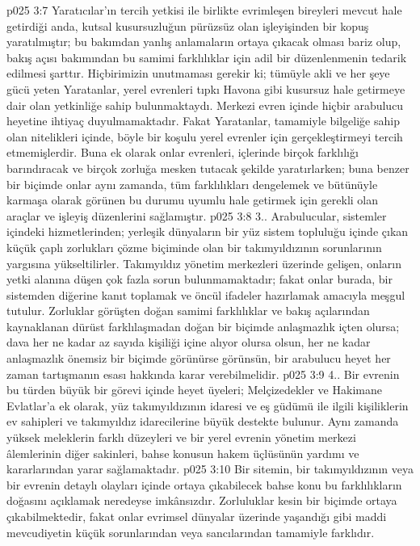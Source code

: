 \vs p025 3:7 Yaratıcılar’ın tercih yetkisi ile birlikte evrimleşen bireyleri mevcut hale getirdiği anda, kutsal kusursuzluğun pürüzsüz olan işleyişinden bir kopuş yaratılmıştır; bu bakımdan yanlış anlamaların ortaya çıkacak olması bariz olup, bakış açısı bakımından bu samimi farklılıklar için adil bir düzenlenmenin tedarik edilmesi şarttır. Hiçbirimizin unutmaması gerekir ki; tümüyle akli ve her şeye gücü yeten Yaratanlar, yerel evrenleri tıpkı Havona gibi kusursuz hale getirmeye dair olan yetkinliğe sahip bulunmaktaydı. Merkezi evren içinde hiçbir arabulucu heyetine ihtiyaç duyulmamaktadır. Fakat Yaratanlar, tamamiyle bilgeliğe sahip olan nitelikleri içinde, böyle bir koşulu yerel evrenler için gerçekleştirmeyi tercih etmemişlerdir. Buna ek olarak onlar evrenleri, içlerinde birçok farklılığı barındıracak ve birçok zorluğa mesken tutacak şekilde yaratırlarken; buna benzer bir biçimde onlar aynı zamanda, tüm farklılıkları dengelemek ve bütünüyle karmaşa olarak görünen bu durumu uyumlu hale getirmek için gerekli olan araçlar ve işleyiş düzenlerini sağlamıştır.
\vs p025 3:8 3.\bibnobreakspace {}. Arabulucular, sistemler içindeki hizmetlerinden; yerleşik dünyaların bir yüz sistem topluluğu içinde çıkan küçük çaplı zorlukları çözme biçiminde olan bir takımyıldızının sorunlarının yargısına yükseltilirler. Takımyıldız yönetim merkezleri üzerinde gelişen, onların yetki alanına düşen çok fazla sorun bulunmamaktadır; fakat onlar burada, bir sistemden diğerine kanıt toplamak ve öncül ifadeler hazırlamak amacıyla meşgul tutulur. Zorluklar görüşten doğan samimi farklılıklar ve bakış açılarından kaynaklanan dürüst farklılaşmadan doğan bir biçimde anlaşmazlık içten olursa; dava her ne kadar az sayıda kişiliği içine alıyor olursa olsun, her ne kadar anlaşmazlık önemsiz bir biçimde görünürse görünsün, bir arabulucu heyet her zaman tartışmanın esası hakkında karar verebilmelidir.
\vs p025 3:9 4.\bibnobreakspace {}. Bir evrenin bu türden büyük bir görevi içinde heyet üyeleri; Melçizedekler ve Hakimane Evlatlar’a ek olarak, yüz takımyıldızının idaresi ve eş güdümü ile ilgili kişiliklerin ev sahipleri ve takımyıldız idarecilerine büyük destekte bulunur. Aynı zamanda yüksek meleklerin farklı düzeyleri ve bir yerel evrenin yönetim merkezi âlemlerinin diğer sakinleri, bahse konusun hakem üçlüsünün yardımı ve kararlarından yarar sağlamaktadır.
\vs p025 3:10 Bir sitemin, bir takımyıldızının veya bir evrenin detaylı olayları içinde ortaya çıkabilecek bahse konu bu farklılıkların doğasını açıklamak neredeyse imkânsızdır. Zorluluklar kesin bir biçimde ortaya çıkabilmektedir, fakat onlar evrimsel dünyalar üzerinde yaşandığı gibi maddi mevcudiyetin küçük sorunlarından veya sancılarından tamamiyle farklıdır.
